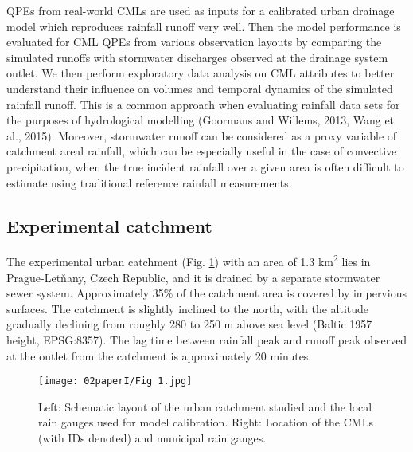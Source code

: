 \documentclass{ctuthesis}\usepackage[]{graphicx}\usepackage[]{color}
\begin{document}
QPEs from real-world CMLs are used as inputs for a calibrated urban drainage model which reproduces rainfall runoff very well. Then the model performance is evaluated for CML QPEs from various observation layouts by comparing the simulated runoffs with stormwater discharges observed at the drainage system outlet. We then perform exploratory data analysis on CML attributes to better understand their influence on volumes and temporal dynamics of the simulated rainfall runoff. This is a common approach when evaluating rainfall data sets for the purposes of hydrological modelling (Goormans and Willems, 2013, Wang et al., 2015). Moreover, stormwater runoff can be considered as a proxy variable of catchment areal rainfall, which can be especially useful in the case of convective precipitation, when the true incident rainfall over a given area is often difficult to estimate using traditional reference rainfall measurements.

\subsection{Experimental catchment}

The experimental urban catchment (Fig. \ref{2fig1}) with an area of 1.3 km\textsuperscript{2} lies in Prague-Letňany, Czech Republic, and it is drained by a separate stormwater sewer system. Approximately 35\% of the catchment area is covered by impervious surfaces. The catchment is slightly inclined to the north, with the altitude gradually declining from roughly 280 to 250 m above sea level (Baltic 1957 height, EPSG:8357). The lag time between rainfall peak and runoff peak observed at the outlet from the catchment is approximately 20 minutes.


\begin{figure}[p]
\begin{center}
\texttt{[image: 02paperI/Fig 1.jpg]}
\caption{Left: Schematic layout of the urban catchment studied and the local rain gauges used for model calibration. Right: Location of the CMLs (with IDs denoted) and municipal rain gauges.} \label{2fig1}
\end{center}
\end{figure}
\end{document}
